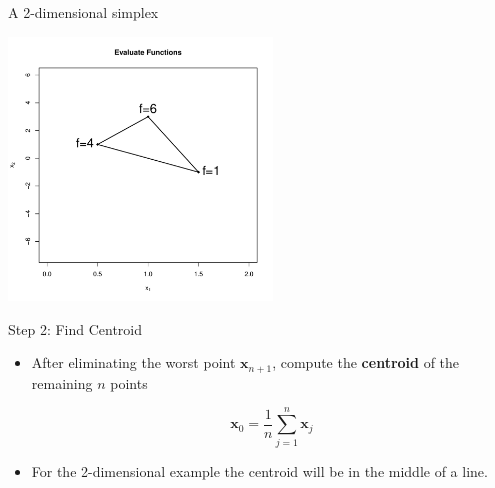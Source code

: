 \documentclass[10pt]{beamer}
\begin{document}
                                                                                              \begin{frame}{A 2-dimensional simplex}
                                                                                                \begin{center}
                                                                                                  \includegraphics[height=7cm]{RCode/nmf.pdf}
                                                                                                \end{center}
                                                                                              \end{frame}
                                                                                              \begin{frame}{Step 2: Find Centroid}
                                                                                                \begin{itemize}
                                                                                                \item After eliminating the worst point ${\bm x_{n+1}}$, compute the {\bf centroid} of the remaining $n$ points

                                                                                                  \begin{equation}
                                                                                                    {\bm x_0}=\frac{1}{n}\sum_{j=1}^{n}  {\bm x_j}
                                                                                                  \end{equation}

                                                                                                \item For the 2-dimensional example the centroid will be in the middle of a line.
                                                                                                \end{itemize}
                                                                                              \end{frame}
\end{document}
